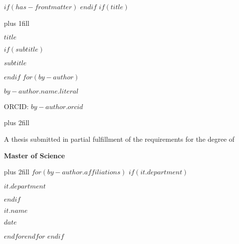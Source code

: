 $if(has-frontmatter)$
\frontmatter
$endif$
$if(title)$
\cleardoublepage
\thispagestyle{empty}
{\centering
\hbox{}\vskip 0cm plus 1fill
{\Large\bfseries $title$ \par}
$if(subtitle)$
\vspace{3ex}
{\small\bfseries $subtitle$ \par}
$endif$
\vspace{12ex}
$for(by-author)$
{\Large\bfseries $by-author.name.literal$ \par}
\vspace{3ex}
{\small ORCID: $by-author.orcid$ \par}
\vskip 0cm plus 2fill
\vspace{5ex}
{\large A thesis submitted in partial fulfillment of the requirements for the degree of \par}
{\bfseries\large Master of Science \par}
\vskip 0cm plus 2fill
\vspace{5ex}
$for(by-author.affiliations)$%
$if(it.department)$%
{\bfseries\large $it.department$ \par}
$endif$%
{\bfseries\large $it.name$ \par}
\vspace{12ex}
{\bfseries\large $date$ \par}
\vspace{12ex}
}
$endfor$$endfor$%
$endif$